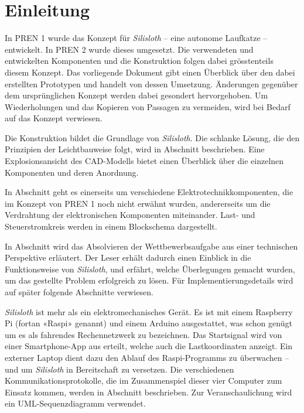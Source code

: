 \section{Einleitung}

In PREN 1 wurde das Konzept für \textit{Silisloth} -- eine autonome Laufkatze -- entwickelt. In PREN 2 wurde dieses umgesetzt. Die verwendeten und entwickelten Komponenten und die Konstruktion folgen dabei grösstenteils diesem Konzept. Das vorliegende Dokument gibt einen Überblick über den dabei erstellten Prototypen und handelt von dessen Umsetzung. Änderungen gegenüber dem ursprünglichen Konzept werden dabei gesondert hervorgehoben. Um Wiederholungen und das Kopieren von Passagen zu vermeiden, wird bei Bedarf auf das Konzept \cite{pren1} verwiesen.

Die Konstruktion bildet die Grundlage von \textit{Silisloth}. Die schlanke Lösung, die den Prinzipien der Leichtbauweise folgt, wird in Abschnitt  beschrieben. Eine Explosionsansicht des CAD-Modells bietet einen Überblick über die einzelnen Komponenten und deren Anordnung.

In Abschnitt  geht es einerseits um verschiedene Elektrotechnikkomponenten, die im Konzept von PREN 1 noch nicht erwähnt wurden, andererseits um die Verdrahtung der elektronischen Komponenten miteinander. Last- und Steuerstromkreis werden in einem Blockschema dargestellt.

In Abschnitt  wird das Absolvieren der Wettbewerbsaufgabe aus einer technischen Perspektive erläutert. Der Leser erhält dadurch einen Einblick in die Funktionsweise von \textit{Silisloth}, und erfährt, welche Überlegungen gemacht wurden, um das gestellte Problem erfolgreich zu lösen. Für Implementierungsdetails wird auf später folgende Abschnitte verwiesen.

\textit{Silisloth} ist mehr als ein elektromechanisches Gerät. Es ist mit einem Raspberry Pi (fortan «Raspi» genannt) und einem Arduino ausgestattet, was schon genügt um es als fahrendes Rechennetzwerk zu bezeichnen. Das Startsignal wird von einer Smartphone-App aus erteilt, welche auch die Lastkoordinaten anzeigt. Ein externer Laptop dient dazu den Ablauf des Raspi-Programms zu überwachen -- und um \textit{Silisloth} in Bereitschaft zu versetzen. Die verschiedenen Kommunikationsprotokolle, die im Zusammenspiel dieser vier Computer zum Einsatz kommen, werden in Abschnitt  beschrieben. Zur Veranschaulichung wird ein UML-Sequenzdiagramm verwendet.

